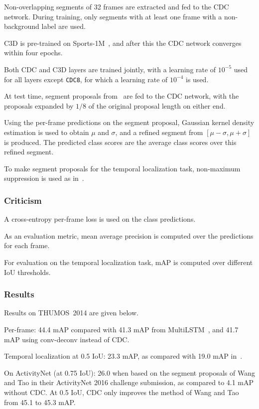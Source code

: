 \documentclass[a4paper, 12pt]{article}
\begin{document}
Non-overlapping segments of 32 frames are extracted and fed to the CDC network.
During training, only segments with at least one frame with a non-background
label are used.

C3D is pre-trained on Sports-1M~\citet{KarpathyCVPR14}, and after this the CDC
network converges within four epochs.

Both CDC and C3D layers are trained jointly, with a learning rate of
$10^{-5}$ used for all layers except \verb|CDC8|, for which a learning rate
of $10^{-4}$ is used.

At test time, segment proposals from~\citet{DBLP:journals/corr/ShouWC16} are
fed to the CDC network, with the proposals expanded by $1/8$ of the original
proposal length on either end.

Using the per-frame predictions on the segment proposal, Gaussian kernel
density estimation is used to obtain $\mu$ and $\sigma$, and a refined segment
from $[\mu - \sigma, \mu + \sigma]$ is produced. The predicted class scores are
the average class scores over this refined segment.

To make segment proposals for the temporal localization task, non-maximum
suppression is used as
in~\citet{DBLP:journals/corr/YeungRJAML15, DBLP:journals/corr/ShouWC16}.

\subsubsection{Criticism}

A cross-entropy per-frame loss is used on the class predictions.

As an evaluation metric, mean average precision is computed over the
predictions for each frame.

For evaluation on the temporal localization task, mAP is computed over
different IoU thresholds.

\subsubsection{Results}

Results on THUMOS~2014 are given below.

Per-frame: 44.4 mAP compared with 41.3 mAP from
MultiLSTM~\citet{DBLP:journals/corr/YeungRJAML15}, and 41.7 mAP using
conv-deconv instead of CDC\@.

Temporal localization at 0.5 IoU\@: 23.3 mAP, as compared with 19.0 mAP
in~\citet{DBLP:journals/corr/ShouWC16}.

On ActivityNet (at 0.75 IoU): 26.0 when based on the segment proposals
of Wang and Tao in their ActivityNet 2016 challenge submission, as compared to
4.1 mAP without CDC\@. At 0.5 IoU, CDC only improves the method of Wang and Tao
from 45.1 to 45.3 mAP\@.
\end{document}
